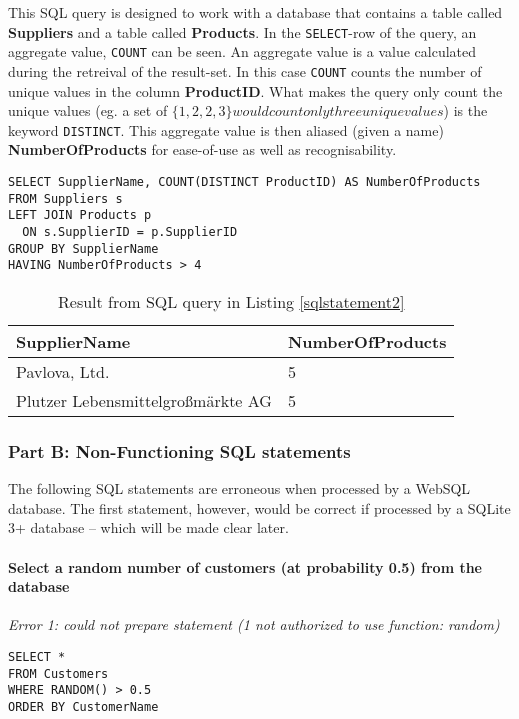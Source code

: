 This SQL query is designed to work with a database that contains a table
called \textbf{Suppliers} and a table called \textbf{Products}. In the
\texttt{SELECT}-row of the query, an aggregate value, \texttt{COUNT} can be
seen. An aggregate value is a value calculated during the retreival of the
result-set. In this case \texttt{COUNT} counts the number of unique
values in the column \textbf{ProductID}. What makes the query only count
the unique values (eg. a set of $\{1,2,2,3\} would count only three unique
values$) is the keyword \texttt{DISTINCT}. This aggregate value is then
aliased (given a name) \textbf{NumberOfProducts} for ease-of-use as well
as recognisability.




\begin{lstlisting}[caption={SQL Query to retreive all suppliers carrying more
      than four products.},label={sqlstatement2}]
SELECT SupplierName, COUNT(DISTINCT ProductID) AS NumberOfProducts
FROM Suppliers s
LEFT JOIN Products p
  ON s.SupplierID = p.SupplierID
GROUP BY SupplierName
HAVING NumberOfProducts > 4
\end{lstlisting}

\begin{table}[h]
  \centering
  \begin{tabular}{ | l | l | }
    \hline
    \textbf{SupplierName} & \textbf{NumberOfProducts} \\
    \hline
    Pavlova, Ltd. & 5  \\
    \hline
    Plutzer Lebensmittelgro{\ss}märkte AG & 5 \\
    \hline
  \end{tabular}
  \caption{Result from SQL query in Listing \ref{sqlstatement2}}
  \label{table:sql2}
\end{table}

\subsubsection{Part B: Non-Functioning SQL statements}
The following SQL statements are erroneous when processed by a WebSQL database.
The first statement, however, would be correct if processed by a SQLite 3+
database -- which will be made clear later.

\paragraph{Select a random number of customers (at probability 0.5) from the
  database}
\textit{Error 1: could not prepare statement (1 not authorized to use function: random)}
\begin{lstlisting}[label={sqlstatement3}]
SELECT *
FROM Customers
WHERE RANDOM() > 0.5
ORDER BY CustomerName
\end{lstlisting}

